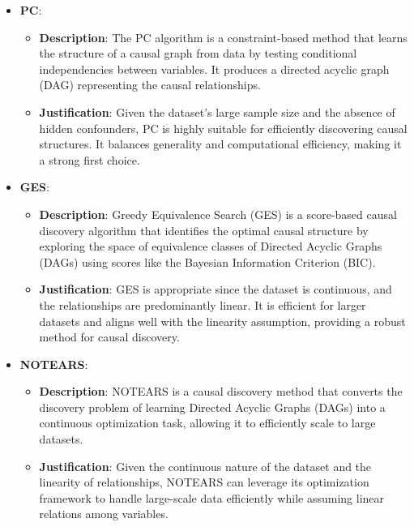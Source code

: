 \documentclass{article}
\begin{document}
\begin{itemize}
    \item \textbf{PC}:
    \begin{itemize}
        \item \textbf{Description}: The PC algorithm is a constraint-based method that learns the structure of a causal graph from data by testing conditional independencies between variables. It produces a directed acyclic graph (DAG) representing the causal relationships.
        \item \textbf{Justification}: Given the dataset's large sample size and the absence of hidden confounders, PC is highly suitable for efficiently discovering causal structures. It balances generality and computational efficiency, making it a strong first choice.
    \end{itemize}

    \item \textbf{GES}:
    \begin{itemize}
        \item \textbf{Description}: Greedy Equivalence Search (GES) is a score-based causal discovery algorithm that identifies the optimal causal structure by exploring the space of equivalence classes of Directed Acyclic Graphs (DAGs) using scores like the Bayesian Information Criterion (BIC).
        \item \textbf{Justification}: GES is appropriate since the dataset is continuous, and the relationships are predominantly linear. It is efficient for larger datasets and aligns well with the linearity assumption, providing a robust method for causal discovery.
    \end{itemize}

    \item \textbf{NOTEARS}:
    \begin{itemize}
        \item \textbf{Description}: NOTEARS is a causal discovery method that converts the discovery problem of learning Directed Acyclic Graphs (DAGs) into a continuous optimization task, allowing it to efficiently scale to large datasets.
        \item \textbf{Justification}: Given the continuous nature of the dataset and the linearity of relationships, NOTEARS can leverage its optimization framework to handle large-scale data efficiently while assuming linear relations among variables.
    \end{itemize}
\end{itemize}
\end{document}
